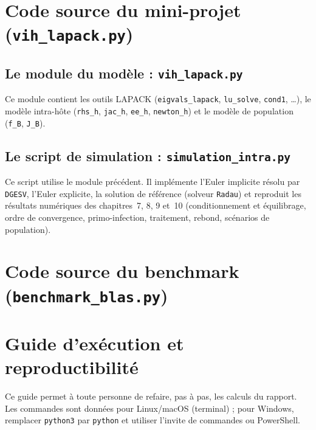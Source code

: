 \documentclass[11pt,a4paper]{report}
\theoremstyle{plain}
\theoremstyle{definition}
\theoremstyle{remark}
\begin{document}
\appendix

\chapter{Code source du mini-projet (\texttt{vih\_lapack.py})}

\section{Le module du modèle : \texttt{vih\_lapack.py}}

Ce module contient les outils LAPACK (\texttt{eigvals\_lapack}, \texttt{lu\_solve}, \texttt{cond1}, \dots), le modèle intra-hôte (\texttt{rhs\_h}, \texttt{jac\_h}, \texttt{ee\_h}, \texttt{newton\_h}) et le modèle de population (\texttt{f\_B}, \texttt{J\_B}).



\section{Le script de simulation : \texttt{simulation\_intra.py}}

Ce script utilise le module précédent. Il implémente l'Euler implicite résolu par \texttt{DGESV}, l'Euler explicite, la solution de référence (solveur \texttt{Radau}) et reproduit les résultats numériques des chapitres~7, 8, 9 et~10 (conditionnement et équilibrage, ordre de convergence, primo-infection, traitement, rebond, scénarios de population).



\chapter{Code source du benchmark (\texttt{benchmark\_blas.py})}



\chapter{Guide d'exécution et reproductibilité}

Ce guide permet à toute personne de refaire, pas à pas, les calculs du rapport. Les commandes sont données pour Linux/macOS (terminal) ; pour Windows, remplacer \texttt{python3} par \texttt{python} et utiliser l'invite de commandes ou PowerShell.
\end{document}
